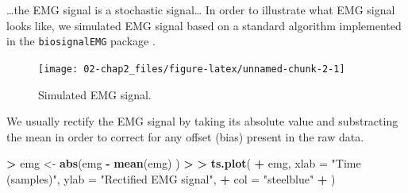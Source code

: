 \documentclass[a4paper,12pt,oneside,oldfontcommands]{memoir}
\newenvironment{Shaded}{\begin{snugshade}}{\end{snugshade}}
\newcommand{\KeywordTok}[1]{\textcolor[rgb]{0.13,0.29,0.53}{\textbf{#1}}}
\newcommand{\DataTypeTok}[1]{\textcolor[rgb]{0.13,0.29,0.53}{#1}}
\newcommand{\DecValTok}[1]{\textcolor[rgb]{0.00,0.00,0.81}{#1}}
\newcommand{\FloatTok}[1]{\textcolor[rgb]{0.00,0.00,0.81}{#1}}
\newcommand{\StringTok}[1]{\textcolor[rgb]{0.31,0.60,0.02}{#1}}
\newcommand{\OperatorTok}[1]{\textcolor[rgb]{0.81,0.36,0.00}{\textbf{#1}}}
\newcommand{\ErrorTok}[1]{\textcolor[rgb]{0.64,0.00,0.00}{\textbf{#1}}}
\newcommand{\NormalTok}[1]{#1}
\begin{document}
\ldots{}the EMG signal is a stochastic signal\ldots{} In order to
illustrate what EMG signal looks like, we simulated EMG signal based on
a standard algorithm implemented in the \texttt{biosignalEMG} package
\citep{R-biosignalEMG}.

\begin{Shaded}
\end{Shaded}

\begin{figure}[H]

{\centering \texttt{[image: 02-chap2\_files/figure-latex/unnamed-chunk-2-1]} 

}

\caption{Simulated EMG signal.}\label{fig:unnamed-chunk-2}
\end{figure}

We usually rectify the EMG signal by taking its absolute value and
substracting the mean in order to correct for any offset (bias) present
in the raw data.

\begin{Shaded}
\begin{Highlighting}[]
\OperatorTok{>}\StringTok{ }\NormalTok{emg <-}\StringTok{ }\KeywordTok{abs}\NormalTok{(emg }\OperatorTok{-}\StringTok{ }\KeywordTok{mean}\NormalTok{(emg) )}
\OperatorTok{>}\StringTok{ }
\ErrorTok{>}\StringTok{ }\KeywordTok{ts.plot}\NormalTok{(}
\OperatorTok{+}\StringTok{   }\NormalTok{emg, }\DataTypeTok{xlab =} \StringTok{"Time (samples)"}\NormalTok{, }\DataTypeTok{ylab =} \StringTok{"Rectified EMG signal"}\NormalTok{,}
\OperatorTok{+}\StringTok{   }\DataTypeTok{col =} \StringTok{"steelblue"}
\OperatorTok{+}\StringTok{   }\NormalTok{)}
\end{Highlighting}
\end{Shaded}
\end{document}
